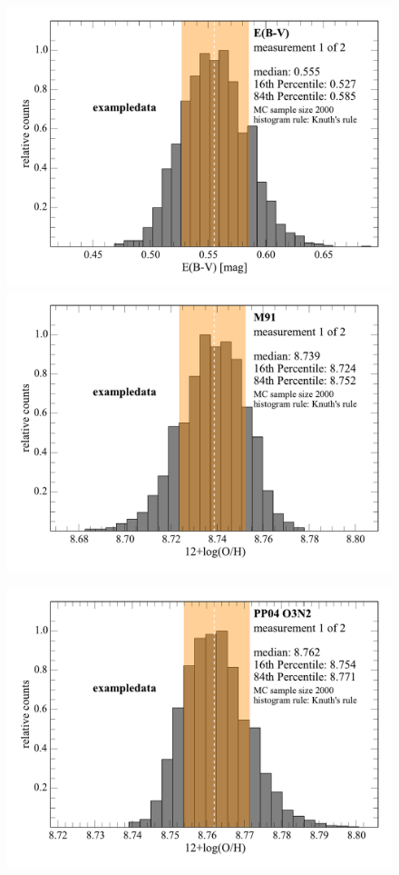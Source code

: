 \documentclass{emulateapj}
\begin{document}
\begin{figure}[!ht]
\centerline{
\includegraphics[width=0.98\columnwidth]{exampledata_n2000_EB-V_1.pdf}
\includegraphics[width=0.98\columnwidth]{exampledata_n2000_M91_1.pdf}}
\centerline{
\includegraphics[width=1.0\columnwidth]{exampledata_n2000_PP04_O3N2_1.pdf}
}
\end{figure}
\end{document}
